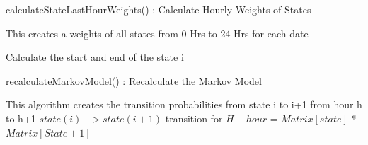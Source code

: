 \documentclass{article}
\begin{document}
\begin{algorithm}
\caption{calculateStateLastHourWeights() : Calculate Hourly Weights of States}
\label{pseudoPSO}
\begin{algorithmic}[1]
\State This creates a weights of all states from 0 Hrs to 24 Hrs for each date

	\State Calculate the start and end of the state i
\EndIf
\EndFor
\end{algorithmic}
\end{algorithm}


\begin{algorithm}
\caption{recalculateMarkovModel() : Recalculate the Markov Model}
\label{pseudoPSO}
\begin{algorithmic}[1]
\State This algorithm creates the transition probabilities from state i to i+1 from hour h to h+1
    	\State $state(i)->state(i+1)$ transition for $H-hour$ = $Matrix[state]$ * $Matrix[State+1]$
	\EndFor
\EndFor
\end{algorithmic}
\end{algorithm}
\end{document}
